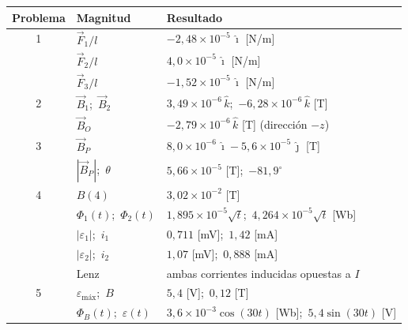 \documentclass[12pt,letterpaper]{article}
\begin{document}
\begin{center}
\small
\renewcommand{\arraystretch}{1.35}
\begin{tabular}{|c|l|l|}
\hline
\textbf{Problema} & \textbf{Magnitud} & \textbf{Resultado} \\
\hline
1 & $\vec{F}_1/l$ & $-2{,}48\times10^{-5}\,\hat{\imath}$ [N/m] \\
  & $\vec{F}_2/l$ & $4{,}0\times10^{-5}\,\hat{\imath}$ [N/m] \\
  & $\vec{F}_3/l$ & $-1{,}52\times10^{-5}\,\hat{\imath}$ [N/m] \\
\hline
2 & $\vec{B}_1$;\ $\vec{B}_2$ & $3{,}49\times10^{-6}\,\hat{k}$;\ $-6{,}28\times10^{-6}\,\hat{k}$ [T] \\
  & $\vec{B}_O$ & $-2{,}79\times10^{-6}\,\hat{k}$ [T] (direcci\'on $-z$) \\
\hline
3 & $\vec{B}_P$ & $8{,}0\times10^{-6}\,\hat{\imath} - 5{,}6\times10^{-5}\,\hat{\jmath}$ [T] \\
  & $|\vec{B}_P|$;\ $\theta$ & $5{,}66\times10^{-5}$ [T];\ $-81{,}9^\circ$ \\
\hline
4 & $B(4)$ & $3{,}02\times10^{-2}$ [T] \\
  & $\Phi_1(t)$;\ $\Phi_2(t)$ & $1{,}895\times10^{-5}\sqrt{t}$;\ $4{,}264\times10^{-5}\sqrt{t}$ [Wb] \\
  & $|\varepsilon_1|$;\ $i_1$ & $0{,}711$ [mV];\ $1{,}42$ [mA] \\
  & $|\varepsilon_2|$;\ $i_2$ & $1{,}07$ [mV];\ $0{,}888$ [mA] \\
  & Lenz & ambas corrientes inducidas opuestas a $I$ \\
\hline
5 & $\varepsilon_{\text{m\'ax}}$;\ $B$ & $5{,}4$ [V];\ $0{,}12$ [T] \\
  & $\Phi_B(t)$;\ $\varepsilon(t)$ & $3{,}6\times10^{-3}\cos(30t)$ [Wb];\ $5{,}4\sin(30t)$ [V] \\
\hline
\end{tabular}
\end{center}
\end{document}
